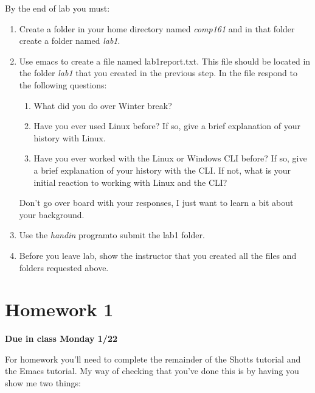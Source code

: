 \documentclass[nobib]{tufte-handout}
\begin{document}
By the end of lab you must:
\begin{enumerate}
\item Create a folder in your home directory named \textit{comp161} and in that folder create a folder named \textit{lab1}.
\item Use emacs to create a file named lab1report.txt. This file should be located in the folder \textit{lab1} that you created in the previous step. In the file respond to the following questions:
\begin{enumerate}
\item What did you do over Winter break?
\item Have you ever used Linux before? If so, give a brief explanation of your history with Linux.
\item Have you ever worked with the Linux or Windows CLI before? If so, give a brief explanation of your history with the CLI\@. If not, what is your initial reaction to working with Linux and the CLI\@?
\end{enumerate}
Don't go over board with your responses, I just want to learn a bit about your background.
\item Use the \textit{handin} programto submit the lab1 folder.
\item Before you leave lab, show the instructor that you created all the files and folders requested above.
\end{enumerate}

\section{Homework 1}

\begin{center}
\textbf{Due in class Monday 1/22}
\end{center}

For homework you'll need to complete the remainder of the Shotts tutorial and the Emacs tutorial.  My way of checking that you've done this is by having you show me two things:
\end{document}
